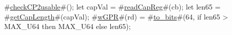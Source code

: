 #\hyperref[sailMIPSzcheckCP2usable]{checkCP2usable}#();
let capVal = #\hyperref[sailMIPSzreadCapReg]{readCapReg}#(cb);
let len65  = #\hyperref[sailMIPSzgetCapLength]{getCapLength}#(capVal);
#\hyperref[sailMIPSzwGPR]{wGPR}#(rd) = #\hyperref[sailMIPSztozybits]{to\_bits}#(64, if len65 > MAX_U64 then MAX_U64 else len65);

